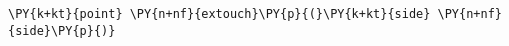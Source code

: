 \begin{Verbatim}[commandchars=\\\{\}]
    \PY{k+kt}{point} \PY{n+nf}{extouch}\PY{p}{(}\PY{k+kt}{side} \PY{n+nf}{side}\PY{p}{)}
\end{Verbatim}
